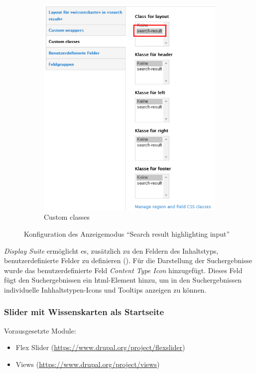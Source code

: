 \begin{figure}[H]
\begin{subfigure}[b]{0.30\textwidth}
		\includegraphics[width=\linewidth]{images/config_searchresult_viewmodesearchclass}
		\caption[]{Custom classes}
		\label{fig:config_searchresult_viewmodesearchclass}
	\end{subfigure}
	\caption{Konfiguration des Anzeigemodus \enquote{Search result highlighting input}}
	\label{fig:config_searchresult}
\end{figure}


\textit{Display Suite} ermöglicht es, zusätzlich zu den Feldern des Inhaltstyps, benutzerdefinierte Felder zu definieren (). Für die Darstellung der Suchergebnisse wurde \zB das benutzerdefinierte Feld \textit{Content Type Icon} hinzugefügt. Dieses Feld fügt den Suchergebnissen ein html-Element hinzu, um in den Suchergebnissen individuelle Inhhaltstypen-Icons und Tooltips anzeigen zu können. 




\newpage
\subsubsection{Slider mit Wissenskarten als Startseite}\label{subsub:wkslider}
Vorausgesetzte Module:
\begin{itemize}
	\item Flex Slider (\url{https://www.drupal.org/project/flexslider})
	\item Views (\url{https://www.drupal.org/project/views})
\end{itemize}


